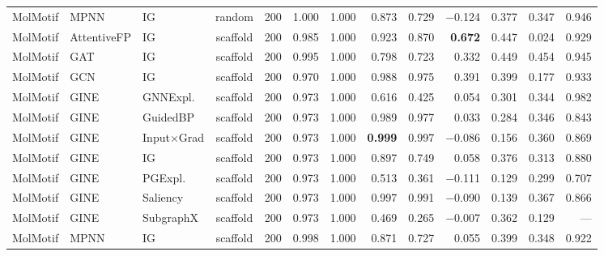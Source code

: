 \begin{table}[t]
{\begin{tabular}{lllcrrrrrrrrr}
MolMotif & MPNN & IG & random & 200 & 1.000 & 1.000 & 0.873 & 0.729 & $-$0.124 & 0.377 & 0.347 & 0.946 \\
\addlinespace[2pt]
MolMotif & AttentiveFP & IG & scaffold & 200 & 0.985 & 1.000 & 0.923 & 0.870 & \textbf{0.672} & 0.447 & 0.024 & 0.929 \\
MolMotif & GAT & IG & scaffold & 200 & 0.995 & 1.000 & 0.798 & 0.723 & 0.332 & 0.449 & 0.454 & 0.945 \\
MolMotif & GCN & IG & scaffold & 200 & 0.970 & 1.000 & 0.988 & 0.975 & 0.391 & 0.399 & 0.177 & 0.933 \\
MolMotif & GINE & GNNExpl. & scaffold & 200 & 0.973 & 1.000 & 0.616 & 0.425 & 0.054 & 0.301 & 0.344 & 0.982 \\
MolMotif & GINE & GuidedBP & scaffold & 200 & 0.973 & 1.000 & 0.989 & 0.977 & 0.033 & 0.284 & 0.346 & 0.843 \\
MolMotif & GINE & Input$\times$Grad & scaffold & 200 & 0.973 & 1.000 & \textbf{0.999} & 0.997 & $-$0.086 & 0.156 & 0.360 & 0.869 \\
MolMotif & GINE & IG & scaffold & 200 & 0.973 & 1.000 & 0.897 & 0.749 & 0.058 & 0.376 & 0.313 & 0.880 \\
MolMotif & GINE & PGExpl. & scaffold & 200 & 0.973 & 1.000 & 0.513 & 0.361 & $-$0.111 & 0.129 & 0.299 & 0.707 \\
MolMotif & GINE & Saliency & scaffold & 200 & 0.973 & 1.000 & 0.997 & 0.991 & $-$0.090 & 0.139 & 0.367 & 0.866 \\
MolMotif & GINE & SubgraphX & scaffold & 200 & 0.973 & 1.000 & 0.469 & 0.265 & $-$0.007 & 0.362 & 0.129 & --- \\
MolMotif & MPNN & IG & scaffold & 200 & 0.998 & 1.000 & 0.871 & 0.727 & 0.055 & 0.399 & 0.348 & 0.922 \\
\bottomrule
\end{tabular}}
\end{table}
